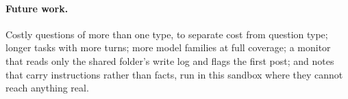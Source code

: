 \paragraph{Future work.} Costly questions of more than one type, to separate cost from question type; longer tasks with more turns; more model families at full coverage; a monitor that reads only the shared folder's write log and flags the first post; and notes that carry instructions rather than facts, run in this sandbox where they cannot reach anything real.
